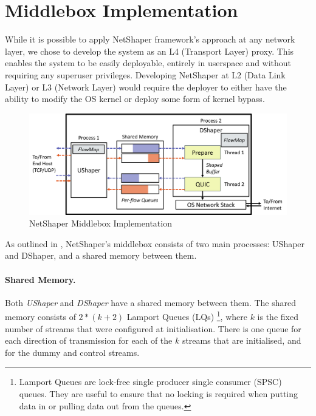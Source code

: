 \section{Middlebox Implementation}
\label{sec:netshaper-middlebox-implementation}

While it is possible to apply NetShaper framework's approach at any network layer, we chose to develop the system as an L4 (Transport Layer) proxy.
This enables the system to be easily deployable, entirely in userspace and without requiring any superuser privileges. 
Developing NetShaper at L2 (Data Link Layer) or L3 (Network Layer) would require the deployer to either have the ability to modify the OS kernel or deploy some form of kernel bypass.

\begin{figure}[!htb]
    \centering
    \includegraphics[width=\columnwidth]{figures/netshaper/middlebox-implementation.png}
    \caption{NetShaper Middlebox Implementation}
    \label{fig:middlebox-implementation}
\end{figure}

As outlined in , NetShaper's middlebox consists of two main processes: UShaper and DShaper, and a shared memory between them.

\paragraph{Shared Memory.}
Both \textit{UShaper} and \textit{DShaper} have a shared memory between them.
The shared memory consists of $2*(k + 2)$ Lamport Queues (LQs) \cite{lamportqueue}
\footnote{Lamport Queues are lock-free single producer single consumer (SPSC) queues. They are useful to ensure that no locking is required when putting data in or pulling data out from the queues.}, 
where $k$ is the fixed number of streams that were configured at initialisation.
There is one queue for each direction of transmission for each of the $k$ streams that are initialised, and for the dummy and control streams.

